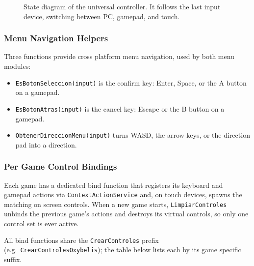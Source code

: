 \documentclass[12pt,letterpaper]{article}
\begin{document}
\begin{figure}[H]
  \centering
  
  \caption{State diagram of the universal controller. It follows the last input device, switching between PC, gamepad, and touch.}
  \label{fig:controller_states}
\end{figure}

\subsubsection{Menu Navigation Helpers}

Three functions provide cross platform menu navigation, used by both menu modules:
\begin{itemize}
  \item \texttt{EsBotonSeleccion(input)} is the confirm key: Enter, Space, or the A button on a gamepad.
  \item \texttt{EsBotonAtras(input)} is the cancel key: Escape or the B button on a gamepad.
  \item \texttt{ObtenerDireccionMenu(input)} turns WASD, the arrow keys, or the direction pad into a direction.
\end{itemize}

\subsubsection{Per Game Control Bindings}

Each game has a dedicated bind function that registers its keyboard and gamepad actions via \texttt{ContextActionService} and, on touch devices, spawns the matching on screen controls. When a new game starts, \texttt{LimpiarControles} unbinds the previous game's actions and destroys its virtual controls, so only one control set is ever active.

All bind functions share the \texttt{CrearControles} prefix (e.g.\ \texttt{CrearControlesOxybelis}); the table below lists each by its game specific suffix.
\end{document}
